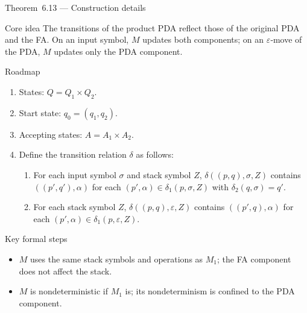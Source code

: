 \begin{frame}[t]{Theorem 6.13 — Construction details}
  \begin{tblock}{Core idea}
    The transitions of the product PDA reflect those of the original PDA
    and the FA.  On an input symbol, $M$ updates both components; on an
    $\varepsilon$‑move of the PDA, $M$ updates only the PDA component.
  \end{tblock}
  \begin{tblock}{Roadmap}
    \begin{enumerate}
      \item States: $Q = Q_1 \times Q_2$.
      \item Start state: $q_0 = (q_1,q_2)$.
      \item Accepting states: $A = A_1 \times A_2$.
      \item Define the transition relation $\delta$ as follows:
        \begin{enumerate}
          \item For each input symbol $\sigma$ and stack symbol $Z$,
            $\delta((p,q),\sigma,Z)$ contains $((p',q'),\alpha)$ for
            each $(p',\alpha) \in \delta_1(p,\sigma,Z)$ with
            $\delta_2(q,\sigma) = q'$.
          \item For each stack symbol $Z$, $\delta((p,q),\varepsilon,Z)$
            contains $((p',q),\alpha)$ for each $(p',\alpha) \in
            \delta_1(p,\varepsilon,Z)$.
        \end{enumerate}
    \end{enumerate}
  \end{tblock}
  \begin{tblock}{Key formal steps}
    \begin{itemize}
      \item $M$ uses the same stack symbols and operations as $M_1$;
        the FA component does not affect the stack.
      \item $M$ is nondeterministic if $M_1$ is; its nondeterminism is
        confined to the PDA component.
    \end{itemize}
  \end{tblock}
  \label{fr:6.2-15}
\end{frame}

